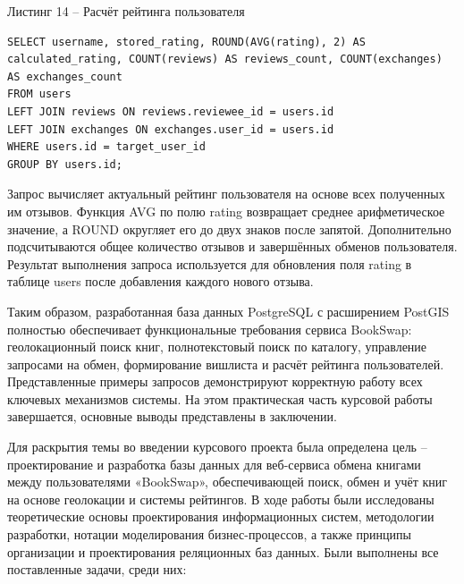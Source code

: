 \documentclass[14pt,a4paper]{extarticle}
\begin{document}
\begin{center}
Листинг 14 -- Расчёт рейтинга пользователя
\end{center}
\begin{lstlisting}
SELECT username, stored_rating, ROUND(AVG(rating), 2) AS
calculated_rating, COUNT(reviews) AS reviews_count, COUNT(exchanges)
AS exchanges_count
FROM users
LEFT JOIN reviews ON reviews.reviewee_id = users.id
LEFT JOIN exchanges ON exchanges.user_id = users.id
WHERE users.id = target_user_id
GROUP BY users.id;
\end{lstlisting}

Запрос вычисляет актуальный рейтинг пользователя на основе всех
полученных им отзывов. Функция AVG по полю rating возвращает среднее
арифметическое значение, а ROUND округляет его до двух знаков после
запятой. Дополнительно подсчитываются общее количество отзывов и
завершённых обменов пользователя. Результат выполнения запроса
используется для обновления поля rating в таблице users после добавления
каждого нового отзыва.

Таким образом, разработанная база данных PostgreSQL с расширением
PostGIS полностью обеспечивает функциональные требования сервиса
BookSwap: геолокационный поиск книг, полнотекстовый поиск по каталогу,
управление запросами на обмен, формирование вишлиста и расчёт рейтинга
пользователей. Представленные примеры запросов демонстрируют корректную
работу всех ключевых механизмов системы. На этом практическая часть
курсовой работы завершается, основные выводы представлены в заключении.

\newpage
\conclusion

Для раскрытия темы во введении курсового проекта была определена цель --
проектирование и разработка базы данных для веб-сервиса обмена книгами
между пользователями «BookSwap», обеспечивающей поиск, обмен и учёт книг
на основе геолокации и системы рейтингов. В ходе работы были исследованы
теоретические основы проектирования информационных систем, методологии
разработки, нотации моделирования бизнес-процессов, а также принципы
организации и проектирования реляционных баз данных. Были выполнены все
поставленные задачи, среди них:
\end{document}
